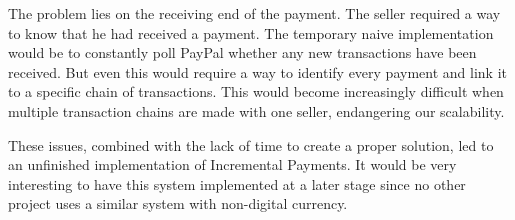 The problem lies on the receiving end of the payment.
The seller required a way to know that he had received a payment.
The temporary naive implementation would be to constantly poll PayPal whether any new transactions have been received.
But even this would require a way to identify every payment and link it to a specific chain of transactions.
This would become increasingly difficult when multiple transaction chains are made with one seller, endangering our scalability.

These issues, combined with the lack of time to create a proper solution, led to an unfinished implementation of Incremental Payments.
It would be very interesting to have this system implemented at a later stage since no other project uses a similar system with non-digital currency.